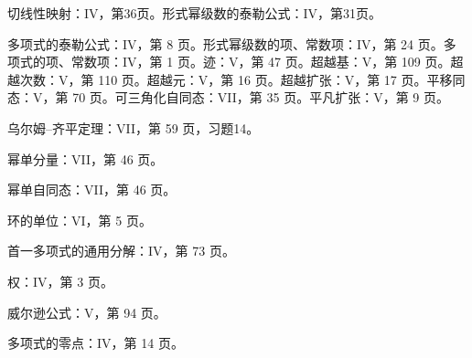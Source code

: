 切线性映射：IV，第36页。形式幂级数的泰勒公式：IV，第31页。

多项式的泰勒公式：IV，第 8 页。形式幂级数的项、常数项：IV，第 24 页。多项式的项、常数项：IV，第 1 页。迹：V，第 47 页。超越基：V，第 109 页。超越次数：V，第 110 页。超越元：V，第 16 页。超越扩张：V，第 17 页。平移同态：V，第 70 页。可三角化自同态：VII，第 35 页。平凡扩张：V，第 9 页。

乌尔姆–齐平定理：VII，第 59 页，习题14。

幂单分量：VII，第 46 页。

幂单自同态：VII，第 46 页。

环的单位：VI，第 5 页。

首一多项式的通用分解：IV，第 73 页。

权：IV，第 3 页。

威尔逊公式：V，第 94 页。

多项式的零点：IV，第 14 页。
